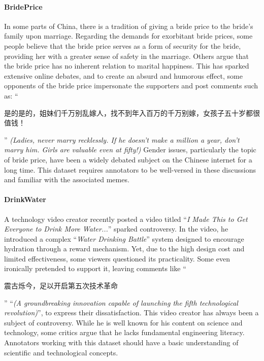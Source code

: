 \paragraph{BridePrice} In some parts of China, there is a tradition of giving a bride price to the bride's family upon marriage. Regarding the demands for exorbitant bride prices, some people believe that the bride price serves as a form of security for the bride, providing her with a greater sense of safety in the marriage. Others argue that the bride price has no inherent relation to marital happiness. This has sparked extensive online debates, and to create an absurd and humorous effect, some opponents of the bride price impersonate the supporters and post comments such as: ``\begin{CJK}{UTF8}{gbsn}是的是的，姐妹们千万别乱嫁人，找不到年入百万的千万别嫁，女孩子五十岁都很值钱！\end{CJK}'' \textit{(Ladies, never marry recklessly. If he doesn't make a million a year, don't marry him. Girls are valuable even at fifty!)}
Gender issues, particularly the topic of bride price, have been a widely debated subject on the Chinese internet for a long time. This dataset requires annotators to be well-versed in these discussions and familiar with the associated memes. 

\paragraph{DrinkWater} A technology video creator recently posted a video titled ``\textit{I Made This to Get Everyone to Drink More Water...}'' sparked controversy. In the video, he introduced a complex ``\textit{Water Drinking Battle}'' system designed to encourage hydration through a reward mechanism. Yet, due to the high design cost and limited effectiveness, some viewers questioned its practicality. Some even ironically pretended to support it, leaving comments like ``\begin{CJK}{UTF8}{gbsn}震古烁今，足以开启第五次技术革命\end{CJK}'' ``\textit{(A groundbreaking innovation capable of launching the fifth technological revolution)}'', to express their dissatisfaction.
This video creator has always been a subject of controversy. While he is well known for his content on science and technology, some critics argue that he lacks fundamental engineering literacy. Annotators working with this dataset should have a basic understanding of scientific and technological concepts. 

